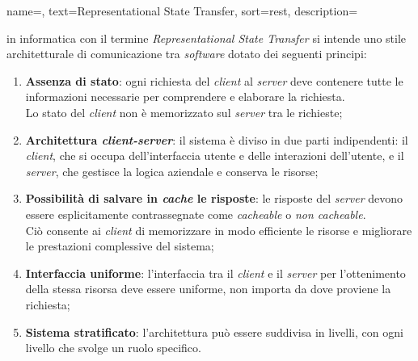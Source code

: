  {
    name=,
    text=Representational State Transfer,
    sort=rest,
    description={in informatica con il termine \emph{Representational State Transfer} si intende uno stile architetturale di comunicazione tra \textit{software} dotato dei seguenti principi: 
    \begin{enumerate}
        \item \textbf{Assenza di stato}: ogni richiesta del \textit{client} al \textit{server} deve contenere tutte le informazioni necessarie per comprendere e elaborare la richiesta. \\ Lo stato del \textit{client} non è memorizzato sul \textit{server} tra le richieste;
        \item \textbf{Architettura \textit{client-server}}: il sistema è diviso in due parti indipendenti: il \textit{client}, che si occupa dell'interfaccia utente e delle interazioni dell'utente, e il \textit{server}, che gestisce la logica aziendale e conserva le risorse;
        \item \textbf{Possibilità di salvare in \textit{cache} le risposte}: le risposte del \textit{server} devono essere esplicitamente contrassegnate come \textit{cacheable} o \textit{non cacheable}. \\ Ciò consente ai \textit{client} di memorizzare in modo efficiente le risorse e migliorare le prestazioni complessive del sistema;
        \item \textbf{Interfaccia uniforme}: l'interfaccia tra il \textit{client} e il \textit{server} per l'ottenimento della stessa risorsa deve essere uniforme, non importa da dove proviene la richiesta;
        \item \textbf{Sistema stratificato}: l'architettura può essere suddivisa in livelli, con ogni livello che svolge un ruolo specifico.
    \end{enumerate}
    \cite{site:rest-ibm}
    }
}


